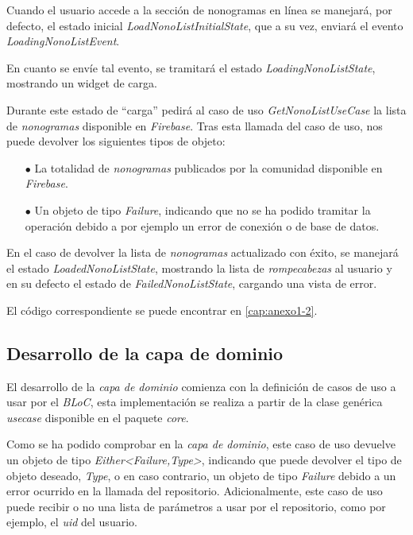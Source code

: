 Cuando el usuario accede a la sección de nonogramas en línea se manejará, por defecto, el estado
inicial \textit{LoadNonoListInitialState}, que a su vez, enviará el evento \textit{LoadingNonoListEvent}.

En cuanto se envíe tal evento, se tramitará el estado \textit{LoadingNonoListState}, mostrando
un widget de carga.

Durante este estado de ``carga'' pedirá al caso de uso \textit{GetNonoListUseCase} la lista de \textit{nonogramas}
disponible en \textit{Firebase}. Tras esta llamada del caso de uso, nos puede devolver los siguientes
tipos de objeto:

\begin{itemize}
  \item[$\bullet$] La totalidad de \textit{nonogramas} publicados por la comunidad disponible en \textit{Firebase}.
  \item[$\bullet$] Un objeto de tipo \textit{Failure}, indicando que no se ha podido tramitar la operación 
  debido a por ejemplo un error de conexión o de base de datos.
\end{itemize}

En el caso de devolver la lista de \textit{nonogramas} actualizado con éxito, se manejará el estado
\textit{LoadedNonoListState}, mostrando la lista de \textit{rompecabezas} al usuario y en su defecto el estado 
de \textit{FailedNonoListState}, cargando una vista de error. 

El código correspondiente se puede encontrar en
\autoref{cap:anexo1-2}.

\break

\subsection{Desarrollo de la capa de dominio}
El desarrollo de la \textit{capa de dominio} comienza con la definición de casos de uso a usar por el \textit{BLoC},
esta implementación se realiza a partir de la clase genérica \textit{usecase} disponible en el paquete \textit{core}.

Como se ha podido comprobar en la \textit{capa de dominio}, este caso de uso devuelve un objeto
de tipo \textit{Either<Failure,Type>}, indicando que puede devolver el tipo de objeto deseado, \textit{Type}, o en caso contrario,
un objeto de tipo \textit{Failure} debido a un error ocurrido en la llamada del repositorio. Adicionalmente, este caso de uso puede
recibir o no una lista de parámetros a usar por el repositorio, como por ejemplo, el \textit{uid} del usuario.

